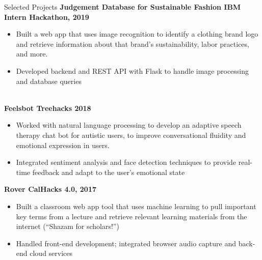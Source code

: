\documentclass{resume} %
\begin{document}

\begin{rSection}{Selected Projects}
{\bf Judgement Database for Sustainable Fashion \hfill {IBM Intern Hackathon, 2019}}
\begin{itemize}
    \item Built a web app that uses image recognition to identify a clothing brand logo and retrieve information about that brand's sustainability, labor practices, and more.
    \item Developed backend and REST API with Flask to handle image processing and database queries
\end{itemize}

\\{\bf Feelsbot \hfill {Treehacks 2018}}
\begin{itemize}
    \item Worked with natural language processing to develop an adaptive speech therapy chat bot for autistic users, to improve conversational fluidity and emotional expression in users.
    \item Integrated sentiment analysis and face detection techniques to provide real-time feedback and adapt to the user's emotional state

\end{itemize}
{\bf Rover \hfill {CalHacks 4.0, 2017}}
\begin{itemize}
    \item Built a classroom web app tool that uses machine learning to pull important key terms from a lecture and retrieve relevant learning materials from the internet (“Shazam for scholars!”)
    \item Handled front-end development; integrated browser audio capture and back-end cloud services
\end{itemize}



\end{rSection}
\end{document}
